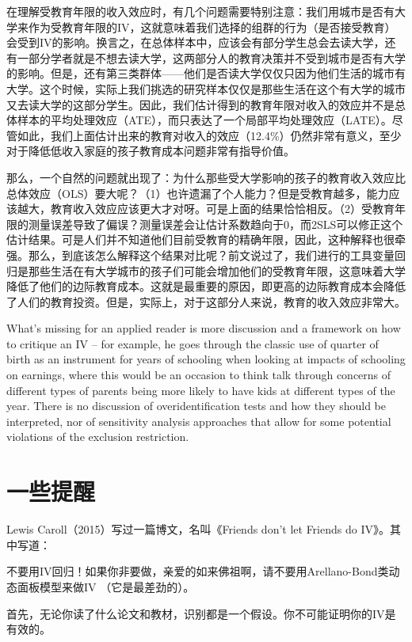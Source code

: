 \documentclass[cn,12pt,math=newtx,citestyle=gb7714-2015,bibstyle=gb7714-2015]{elegantbook}
\begin{document}
	在理解受教育年限的收入效应时，有几个问题需要特别注意：我们用城市是否有大学来作为受教育年限的IV，这就意味着我们选择的组群的行为（是否接受教育）会受到IV的影响。换言之，在总体样本中，应该会有部分学生总会去读大学，还有一部分学者就是不想去读大学，这两部分人的教育决策并不受到城市是否有大学的影响。但是，还有第三类群体——他们是否读大学仅仅只因为他们生活的城市有大学。这个时候，实际上我们挑选的研究样本仅仅是那些生活在这个有大学的城市又去读大学的这部分学生。因此，我们估计得到的教育年限对收入的效应并不是总体样本的平均处理效应（ATE），而只表达了一个局部平均处理效应（LATE）。尽管如此，我们上面估计出来的教育对收入的效应（12.4\%）仍然非常有意义，至少对于降低低收入家庭的孩子教育成本问题非常有指导价值。
	
	那么，一个自然的问题就出现了：为什么那些受大学影响的孩子的教育收入效应比总体效应（OLS）要大呢？（1）也许遗漏了个人能力？但是受教育越多，能力应该越大，教育收入效应应该更大才对呀。可是上面的结果恰恰相反。（2）受教育年限的测量误差导致了偏误？测量误差会让估计系数趋向于0，而2SLS可以修正这个估计结果。可是人们并不知道他们目前受教育的精确年限，因此，这种解释也很牵强。那么，到底该怎么解释这个结果对比呢？前文说过了，我们进行的工具变量回归是那些生活在有大学城市的孩子们可能会增加他们的受教育年限，这意味着大学降低了他们的边际教育成本。这就是最重要的原因，即更高的边际教育成本会降低了人们的教育投资。但是，实际上，对于这部分人来说，教育的收入效应非常大。
	
	What’s missing for an applied reader is more discussion and a framework on how to critique an IV – for example, he goes through the classic use of quarter of birth as an instrument for years of schooling when looking at impacts of schooling on earnings, where this would be an occasion to think talk through concerns of different types of parents being more likely to have kids at different types of the year. There is no discussion of overidentification tests and how they should be interpreted, nor of sensitivity analysis approaches that allow for some potential violations of the exclusion restriction.
	
	
	\section{一些提醒}
	
	Lewis Caroll（2015）写过一篇博文，名叫《Friends don't let Friends do IV》。其中写道：
	
	不要用IV回归！如果你非要做，亲爱的如来佛祖啊，请不要用Arellano-Bond类动态面板模型来做IV （它是最差劲的）。
	
	首先，无论你读了什么论文和教材，识别都是一个假设。你不可能证明你的IV是有效的。
	
\end{document}
